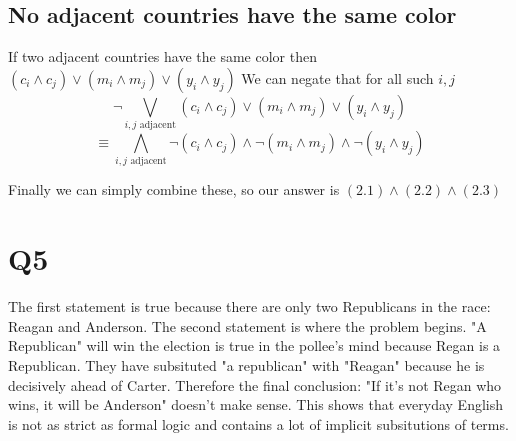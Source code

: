 \documentclass[12pt]{article}
\begin{document}
\subsection{No adjacent countries have the same color}
If two adjacent countries have the same color then $(c_i \land c_j) \lor (m_i \land m_j) \lor (y_i \land y_j)$
We can negate that for all such $i,j$
\[\neg\bigvee_{i,j \text{ adjacent}}(c_i \land c_j) \lor (m_i \land m_j) \lor (y_i \land y_j)\]
\[\equiv \bigwedge_{i,j \text{ adjacent}}\neg(c_i \land c_j) \land \neg(m_i \land m_j) \land \neg (y_i \land y_j)\]

Finally we can simply combine these, so our answer is $(2.1)\land(2.2)\land(2.3)$

\section{Q5}
The first statement is true because there are only two Republicans in the race: 
Reagan and Anderson. The second statement is where the problem begins. "A Republican" 
will win the election is true in the pollee's mind because Regan is a Republican. 
They have subsituted "a republican" with "Reagan" because he is decisively
ahead of Carter. Therefore the final conclusion: "If it's not Regan who wins, it will 
be Anderson" doesn't make sense.
\newline
This shows that everyday English is not as strict as formal logic and contains a lot 
of implicit subsitutions of terms.
\end{document}
